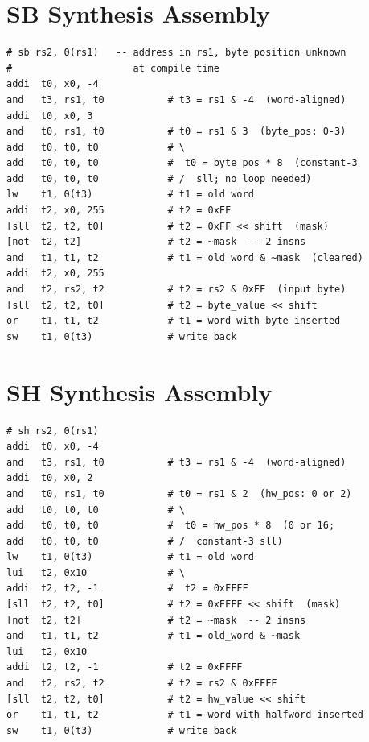 \chapter{SB Synthesis Assembly} \label{apx:sb-asm}

\begin{lstlisting}
# sb rs2, 0(rs1)   -- address in rs1, byte position unknown
#                     at compile time
addi  t0, x0, -4
and   t3, rs1, t0           # t3 = rs1 & -4  (word-aligned)
addi  t0, x0, 3
and   t0, rs1, t0           # t0 = rs1 & 3  (byte_pos: 0-3)
add   t0, t0, t0            # \
add   t0, t0, t0            #  t0 = byte_pos * 8  (constant-3
add   t0, t0, t0            # /  sll; no loop needed)
lw    t1, 0(t3)             # t1 = old word
addi  t2, x0, 255           # t2 = 0xFF
[sll  t2, t2, t0]           # t2 = 0xFF << shift  (mask)
[not  t2, t2]               # t2 = ~mask  -- 2 insns
and   t1, t1, t2            # t1 = old_word & ~mask  (cleared)
addi  t2, x0, 255
and   t2, rs2, t2           # t2 = rs2 & 0xFF  (input byte)
[sll  t2, t2, t0]           # t2 = byte_value << shift
or    t1, t1, t2            # t1 = word with byte inserted
sw    t1, 0(t3)             # write back
\end{lstlisting}


\chapter{SH Synthesis Assembly} \label{apx:sh-asm}

\begin{lstlisting}
# sh rs2, 0(rs1)
addi  t0, x0, -4
and   t3, rs1, t0           # t3 = rs1 & -4  (word-aligned)
addi  t0, x0, 2
and   t0, rs1, t0           # t0 = rs1 & 2  (hw_pos: 0 or 2)
add   t0, t0, t0            # \
add   t0, t0, t0            #  t0 = hw_pos * 8  (0 or 16;
add   t0, t0, t0            # /  constant-3 sll)
lw    t1, 0(t3)             # t1 = old word
lui   t2, 0x10              # \
addi  t2, t2, -1            #  t2 = 0xFFFF
[sll  t2, t2, t0]           # t2 = 0xFFFF << shift  (mask)
[not  t2, t2]               # t2 = ~mask  -- 2 insns
and   t1, t1, t2            # t1 = old_word & ~mask
lui   t2, 0x10
addi  t2, t2, -1            # t2 = 0xFFFF
and   t2, rs2, t2           # t2 = rs2 & 0xFFFF
[sll  t2, t2, t0]           # t2 = hw_value << shift
or    t1, t1, t2            # t1 = word with halfword inserted
sw    t1, 0(t3)             # write back
\end{lstlisting}
